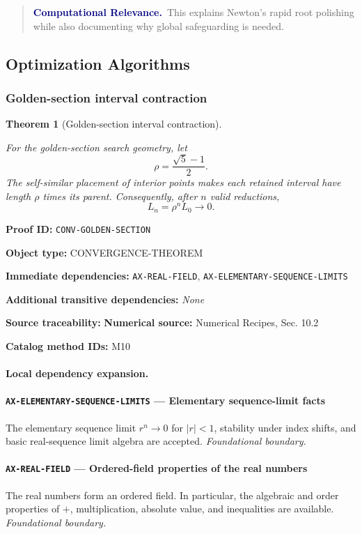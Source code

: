 \documentclass[10pt]{article}
\newcommand{\pidraw}[1]{\begingroup\urlstyle{tt}\nolinkurl{#1}\endgroup}
\newtheorem{theorem}{Theorem}[section]
\theoremstyle{definition}
\theoremstyle{remark}
\newenvironment{computationalrelevance}
{\begin{quote}\small\noindent\textbf{\textcolor{navy}{Computational Relevance.}}\ }
{\end{quote}}
\newcommand{\meta}[2]{\noindent\textbf{#1:} #2\par}
\begin{document}
\begin{computationalrelevance}This explains Newton's rapid root polishing while also documenting why global safeguarding is needed.\end{computationalrelevance}

\subsection{Optimization Algorithms}

\subsubsection{Golden-section interval contraction}

\begin{theorem}[Golden-section interval contraction]\label{prf:CONV-GOLDEN-SECTION}

For the golden-section search geometry, let
\[
\rho=\frac{\sqrt5-1}{2}.
\]
The self-similar placement of interior points makes each retained interval have length $\rho$ times its parent. Consequently, after $n$ valid reductions,
\[
L_n=\rho^n L_0\to0.
\]

\end{theorem}

\meta{Proof ID}{\pidraw{CONV-GOLDEN-SECTION}}
\meta{Object type}{CONVERGENCE-THEOREM}
\meta{Immediate dependencies}{\pidraw{AX-REAL-FIELD}, \pidraw{AX-ELEMENTARY-SEQUENCE-LIMITS}}
\meta{Additional transitive dependencies}{\emph{None}}
\meta{Source traceability}{\textbf{Numerical source:} Numerical Recipes, Sec. 10.2}
\meta{Catalog method IDs}{M10}

\paragraph{Local dependency expansion.}

\paragraph{\pidraw{AX-ELEMENTARY-SEQUENCE-LIMITS} --- Elementary sequence-limit facts}
The elementary sequence limit $r^n\to0$ for $|r|<1$, stability under index shifts, and basic real-sequence limit algebra are accepted.
\textit{Foundational boundary.}

\paragraph{\pidraw{AX-REAL-FIELD} --- Ordered-field properties of the real numbers}
The real numbers form an ordered field. In particular, the algebraic and order properties of $+$, multiplication, absolute value, and inequalities are available.
\textit{Foundational boundary.}
\end{document}
